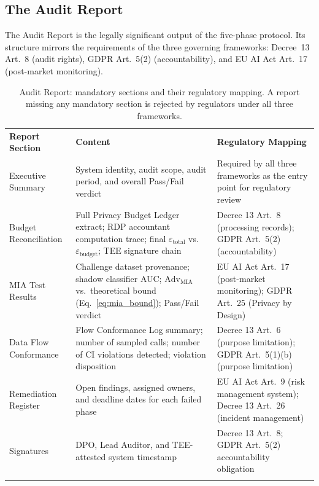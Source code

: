 \subsection{The Audit Report}
\label{subsec:audit_report}

The Audit Report is the legally significant output of the five-phase protocol. Its structure mirrors the requirements of the three governing frameworks: Decree~13 Art.~8 (audit rights), GDPR Art.~5(2) (accountability), and EU AI Act Art.~17 (post-market monitoring).

\begin{table}[ht]
\centering
\caption{Audit Report: mandatory sections and their regulatory mapping. A report missing any mandatory section is rejected by regulators under all three frameworks.}
\label{tab:audit_report}
\renewcommand{\arraystretch}{1.3}
\begin{tabular}{p{3.2cm} p{4.2cm} p{4.6cm}}
\hline\noalign{\smallskip}
\textbf{Report Section} & \textbf{Content} & \textbf{Regulatory Mapping} \\
\noalign{\smallskip}\svhline\noalign{\smallskip}
Executive Summary & System identity, audit scope, audit period, and overall Pass/Fail verdict & Required by all three frameworks as the entry point for regulatory review \\[4pt]
Budget Reconciliation & Full Privacy Budget Ledger extract; RDP accountant computation trace; final $\varepsilon_{\text{total}}$ vs.\ $\varepsilon_{\text{budget}}$; TEE signature chain & Decree 13 Art.~8 (processing records); GDPR Art.~5(2) (accountability) \\[4pt]
MIA Test Results & Challenge dataset provenance; shadow classifier AUC; $\mathrm{Adv}_{\text{MIA}}$ vs.\ theoretical bound (Eq.~\ref{eq:mia_bound}); Pass/Fail verdict & EU AI Act Art.~17 (post-market monitoring); GDPR Art.~25 (Privacy by Design) \\[4pt]
Data Flow Conformance & Flow Conformance Log summary; number of sampled calls; number of CI violations detected; violation disposition & Decree 13 Art.~6 (purpose limitation); GDPR Art.~5(1)(b) (purpose limitation) \\[4pt]
Remediation Register & Open findings, assigned owners, and deadline dates for each failed phase & EU AI Act Art.~9 (risk management system); Decree 13 Art.~26 (incident management) \\[4pt]
Signatures & DPO, Lead Auditor, and TEE-attested system timestamp & Decree 13 Art.~8; GDPR Art.~5(2) accountability obligation \\
\noalign{\smallskip}\hline\noalign{\smallskip}
\end{tabular}
\end{table}

